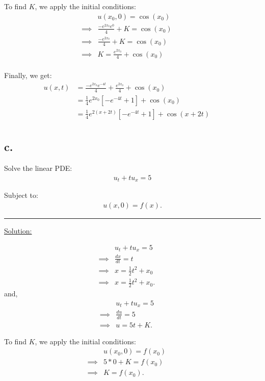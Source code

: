 \documentclass{article}
\begin{document}
To find $K$, we apply the initial conditions:
\begin{align*}
  &u(x_0,0) = \cos(x_0) &&\\
  \implies& \frac{-e^{2x_{0}}e^{0}}{4} + K = \cos(x_0) &&\\
  \implies& \frac{-e^{2x_{0}}}{4} + K = \cos(x_0) &&\\
  \implies& K = \frac{e^{2x_{0}}}{4} + \cos(x_0) &&\\
\end{align*}

Finally, we get:
\begin{align*}
  u(x,t) &= \frac{-e^{2x_{0}}e^{-4t}}{4} + \frac{e^{2x_{0}}}{4} + \cos(x_0) &&\\
  &= \frac{1}{4} e^{2x_{0}} \left[ -e^{-4t} + 1 \right] + \cos(x_0) &&\\
  &= \frac{1}{4}e^{2(x+2t)} \left[ -e^{-4t} + 1 \right] + \cos(x+2t) &&\\
\end{align*}
\newpage

\subsection*{c.}
Solve the linear PDE:
\begin{align*}
  u_t + t u_x = 5
\end{align*}

Subject to:
\begin{align*}
  u(x,0) = f(x).
\end{align*}

\begin{center}
  \noindent\rule{8cm}{0.4pt}
\end{center}

\underline{Solution:}

\begin{align*}
  &u_t + t u_x = 5 &&\\
  \implies& \frac{dx}{dt} = t &&\\
  \implies& x = \frac{1}{2} t^2 + x_0 &&\\
  \implies& x = \frac{1}{2} t^2 + x_0.
\end{align*}
and,
\begin{align*}
  &u_t + t u_x = 5 &&\\
  \implies& \frac{du}{dt} = 5 &&\\
  \implies& u = 5t + K.
\end{align*}

To find $K$, we apply the initial conditions:
\begin{align*}
  &u(x_0,0) = f(x_0) &&\\
  \implies& 5*0 + K = f(x_0) &&\\
  \implies& K = f(x_0).
\end{align*}
\end{document}

